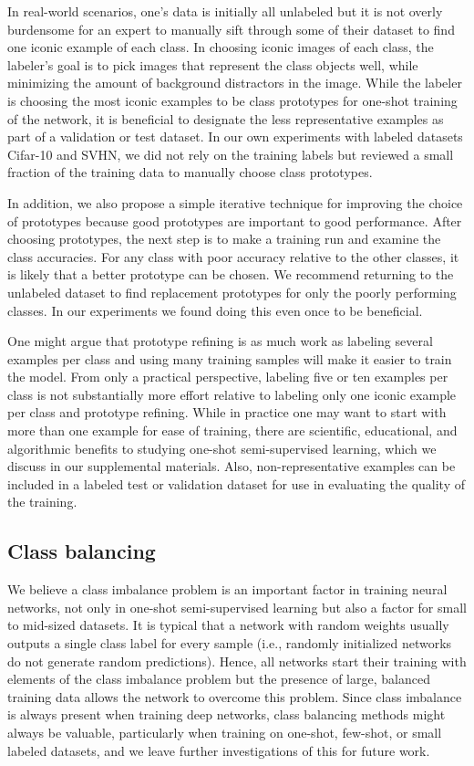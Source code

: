 \documentclass[final]{cvpr}
\newcommand{\OSSSL}{one-shot semi-supervised learning }
\newcommand{\OSSSLno}{one-shot semi-supervised learning}
\begin{document}
In real-world scenarios, one's data is initially all unlabeled but it is not overly burdensome for an expert to manually sift through some of their dataset to find one iconic example of each class.
In choosing iconic images of each class, the labeler's goal is to pick images that represent the class objects well, while minimizing the amount of background distractors in the image.
While the labeler is choosing the most iconic examples to be class prototypes for one-shot training of the network, it is beneficial to designate the less representative examples as part of a validation or test dataset.
In our own experiments with labeled datasets Cifar-10 and SVHN, we did not rely on the training labels but reviewed a small fraction of the training data to manually choose class prototypes.

In addition, we also propose a simple iterative technique for improving the choice of prototypes because good prototypes are important to good performance.
After choosing prototypes, the next step is to make a training run and examine the class accuracies.
For any class with poor accuracy relative to the other classes, it is likely that a better prototype can be chosen.  
We recommend returning to the unlabeled dataset to find replacement prototypes for only the poorly performing classes.
In our experiments we found doing this even once to be beneficial.


One might argue that prototype refining is as much work as labeling several examples per class and using many training samples will make it easier to train the model.
From only a practical perspective, labeling five or ten examples per class is not substantially more effort relative to labeling only one iconic example per class and prototype refining.
While in practice one may want to start with more than one example for ease of training, there are scientific, educational, and algorithmic benefits to studying \OSSSLno, which we discuss in our supplemental materials.
Also, non-representative examples can be included in a labeled test or validation dataset for use in evaluating the quality of the training.

\subsection{Class balancing}
\label{sec:balancing}

We believe a class imbalance problem is an important factor in training neural networks, not only in \OSSSL but also a factor for small to mid-sized datasets.
It is typical that a network with random weights usually outputs a single class label for every sample (i.e., randomly initialized networks do not generate random predictions). 
Hence, all networks start their training with elements of the class imbalance problem but the presence of large, balanced training data allows the network to overcome this problem.
Since class imbalance is always present when training deep networks, class balancing methods might always be valuable,  particularly when training on one-shot, few-shot, or small labeled datasets, and we leave further investigations of this for future work.
\end{document}
